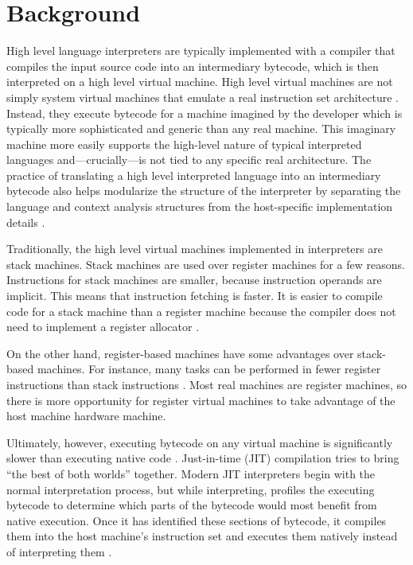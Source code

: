 	\section{Background}
		High level language interpreters are typically implemented with a compiler that compiles the input source code into an intermediary bytecode, which is then interpreted on a high level virtual machine. High level virtual machines are not simply system virtual machines that emulate a real instruction set architecture \citep{smithvmarticle}. Instead, they execute bytecode for a machine imagined by the developer which is typically more sophisticated and generic than any real machine. This imaginary machine more easily supports the high-level nature of typical interpreted languages and---crucially---is not tied to any specific real architecture. The practice of translating a high level interpreted language into an intermediary bytecode also helps modularize the structure of the interpreter by separating the language and context analysis structures from the host-specific implementation details \citep{structureinterpreters}.
	
		Traditionally, the high level virtual machines implemented in interpreters are stack machines. Stack machines are used over register machines for a few reasons. Instructions for stack machines are smaller, because instruction operands are implicit. This means that instruction fetching is faster. It is easier to compile code for a stack machine than a register machine because the compiler does not need to implement a register allocator \citep{caseregistervm}.
	
		On the other hand, register-based machines have some advantages over stack-based machines. For instance, many tasks can be performed in fewer register instructions than stack instructions \citep{caseregistervm}. Most real machines are register machines, so there is more opportunity for register virtual machines to take advantage of the host machine hardware machine. 
		
		Ultimately, however, executing bytecode on any virtual machine is significantly slower than executing native code \citep{optimizingindirectbranch}. Just-in-time (JIT) compilation tries to bring ``the best of both worlds'' together. Modern JIT interpreters begin with the normal interpretation process, but while interpreting, profiles the executing bytecode to determine which parts of the bytecode would most benefit from native execution. Once it has identified these sections of bytecode, it compiles them into the host machine's instruction set and executes them natively instead of interpreting them \citep{historyjit}. 
		
